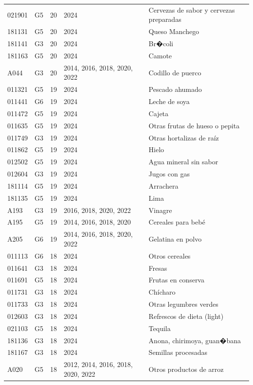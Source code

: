 \begin{table}[ht]
\begin{tabular}{llrll}
  021901 & G5 &  20 & 2024 & Cervezas de sabor y cervezas preparadas \\ 
  181131 & G5 &  20 & 2024 & Queso Manchego \\ 
  181141 & G3 &  20 & 2024 & Br�coli \\ 
  181163 & G5 &  20 & 2024 & Camote \\ 
  A044 & G3 &  20 & 2014, 2016, 2018, 2020, 2022 & Codillo de puerco \\ 
  011321 & G5 &  19 & 2024 & Pescado ahumado \\ 
  011441 & G6 &  19 & 2024 & Leche de soya \\ 
  011472 & G5 &  19 & 2024 & Cajeta \\ 
  011635 & G5 &  19 & 2024 & Otras frutas de hueso o pepita \\ 
  011749 & G3 &  19 & 2024 & Otras hortalizas de raíz \\ 
  011862 & G5 &  19 & 2024 & Hielo \\ 
  012502 & G5 &  19 & 2024 & Agua mineral sin sabor \\ 
  012604 & G3 &  19 & 2024 & Jugos con gas \\ 
  181114 & G5 &  19 & 2024 & Arrachera \\ 
  181135 & G5 &  19 & 2024 & Lima \\ 
  A193 & G3 &  19 & 2016, 2018, 2020, 2022 & Vinagre \\ 
  A195 & G5 &  19 & 2014, 2016, 2018, 2020 & Cereales para bebé \\ 
  A205 & G6 &  19 & 2014, 2016, 2018, 2020, 2022 & Gelatina en polvo \\ 
  011113 & G6 &  18 & 2024 & Otros cereales \\ 
  011641 & G3 &  18 & 2024 & Fresas \\ 
  011691 & G5 &  18 & 2024 & Frutas en conserva \\ 
  011731 & G3 &  18 & 2024 & Chícharo \\ 
  011733 & G3 &  18 & 2024 & Otras legumbres verdes \\ 
  012603 & G3 &  18 & 2024 & Refrescos de dieta (light) \\ 
  021103 & G5 &  18 & 2024 & Tequila \\ 
  181136 & G3 &  18 & 2024 & Anona, chirimoya, guan�bana \\ 
  181167 & G3 &  18 & 2024 & Semillas procesadas \\ 
  A020 & G5 &  18 & 2012, 2014, 2016, 2018, 2020, 2022 & Otros productos de arroz \\ 

\end{tabular}
\end{table}
